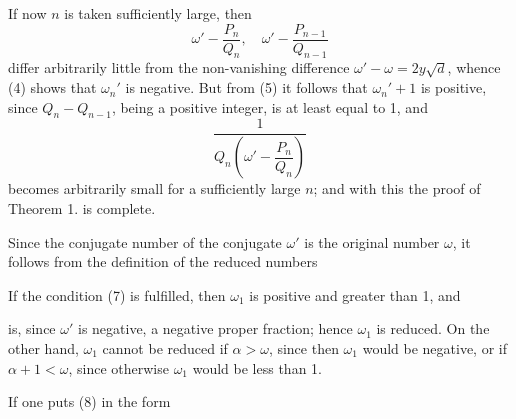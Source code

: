 

If now $n$ is taken sufficiently large, then
\[
\omega' - \frac{P_n}{Q_n}, \quad \omega' - \frac{P_{n-1}}{Q_{n-1}}
\]
differ arbitrarily little from the non-vanishing difference $\omega' - \omega = 2y\sqrt{d}$, whence (4) shows that $\omega_n'$ is negative. But from (5) it follows that $\omega_n' + 1$ is positive, since $Q_n - Q_{n-1}$, being a positive integer, is at least equal to 1, and
\[
\frac{1}{Q_n\left(\omega' - \dfrac{P_n}{Q_n}\right)}
\]
becomes arbitrarily small for a sufficiently large $n$; and with this the proof of Theorem 1. is complete.

Since the conjugate number of the conjugate $\omega'$ is the original number $\omega$, it follows from the definition of the reduced numbers 





If the condition (7) is fulfilled, then $\omega_1$ is positive and greater than 1, and


is, since $\omega'$ is negative, a negative proper fraction; hence $\omega_1$ is reduced. On the other hand, $\omega_1$ cannot be reduced if $\alpha > \omega$, since then $\omega_1$ would be negative, or if $\alpha + 1 < \omega$, since otherwise $\omega_1$ would be less than 1.

If one puts (8) in the form

